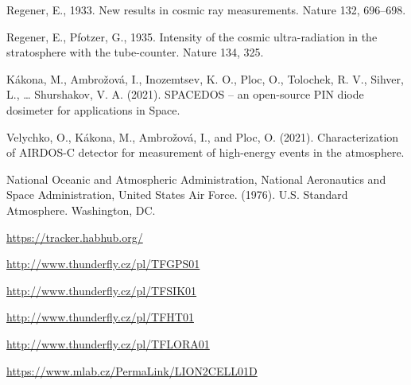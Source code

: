 \documentclass{Rpd}
\begin{document}
\begin{thebibliography}{99.}
 Regener, E., 1933. New results in cosmic ray measurements. Nature 132, 696–698.

 Regener, E., Pfotzer, G., 1935. Intensity of the cosmic ultra-radiation in the stratosphere with the tube-counter. Nature 134, 325.

 Kákona, M., Ambrožová, I., Inozemtsev, K. O., Ploc, O., Tolochek, R. V., Sihver, L., … Shurshakov, V. A. (2021). SPACEDOS – an open-source PIN diode dosimeter for applications in Space.

 Velychko, O., Kákona, M., Ambrožová, I., and Ploc, O. (2021). Characterization of AIRDOS-C detector for measurement of high-energy events in the atmosphere.

 National Oceanic and Atmospheric Administration, National Aeronautics and Space Administration, United States Air Force. (1976). U.S. Standard Atmosphere. Washington, DC.

 \url{https://tracker.habhub.org/}

 \url{http://www.thunderfly.cz/pl/TFGPS01}

 \url{http://www.thunderfly.cz/pl/TFSIK01}

 \url{http://www.thunderfly.cz/pl/TFHT01}

 \url{http://www.thunderfly.cz/pl/TFLORA01}

 \url{https://www.mlab.cz/PermaLink/LION2CELL01D}



\end{thebibliography}
\end{document}
